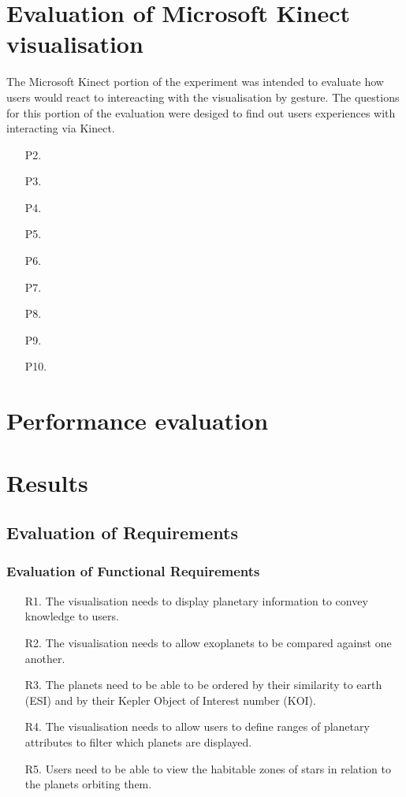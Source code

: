 \section{Evaluation of Microsoft Kinect visualisation}
The Microsoft Kinect portion of the experiment was intended to evaluate how
users would react to intereacting with the visualisation by gesture. The
questions for this portion of the evaluation were desiged to find out users
experiences with interacting via Kinect.

\begin{enumerate}
 \item[P2.]
  \item[P3.]
   \item[P4.]
    \item[P5.]
     \item[P6.]
      \item[P7.]
       \item[P8.]
        \item[P9.]
         \item[P10.]
\end{enumerate}

\section{Performance evaluation}

\section{Results}
\subsection{Evaluation of Requirements}
\subsubsection{Evaluation of Functional Requirements}
\begin{enumerate}

 \item[R1.] The visualisation needs to display planetary information to convey
knowledge to users.

 \item[R2.] The visualisation needs to allow exoplanets to be compared against
one another.

 \item[R3.] The planets need to be able to be ordered by their similarity to
earth (ESI) and by their Kepler Object of Interest number (KOI).
 
 \item[R4.] The visualisation needs to allow users to define ranges of planetary
attributes to filter which planets are displayed.

 \item[R5.] Users need to be able to view the habitable zones of stars in
relation to the planets orbiting them.

\end{enumerate}

